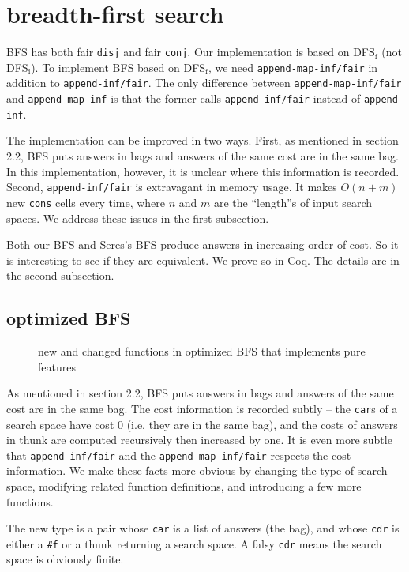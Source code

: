 \documentclass[format=acmlarge, review=true, authordraft=true]{acmart}
\newcommand{\conj}{\texttt{conj}}
\newcommand{\disj}{\texttt{disj}}
\newcommand{\DFSf }[0]{DFS$_\textrm{f}$}
\newcommand{\BFS  }[0]{BFS}
\begin{document}
\section{breadth-first search}

BFS has both fair \disj{} and fair \conj{}. Our implementation is based on 
DFS$_\textrm{f}$ (not DFS$_\textrm{i}$). To implement \BFS{} based on \DFSf{}, 
we need \texttt{append-map-inf/fair} in addition to \texttt{append-inf/fair}. 
The only difference between \texttt{append-map-inf/fair} and 
\texttt{append-map-inf} is that the former calls \texttt{append-inf/fair} 
instead of \texttt{append-inf}.

The implementation can be improved in two ways. First, as mentioned in 
section 2.2, BFS puts answers in bags and answers of the same cost are in the 
same bag. In this implementation, however, it is unclear where this information 
is recorded. Second, \texttt{append-inf/fair} is extravagant in memory usage. It 
makes $O(n+m)$ new \texttt{cons} cells every time, where $n$ and $m$ are the 
``length''s of input search spaces. We address these issues in the first 
subsection.

Both our BFS and Seres's BFS \citet{seres1999algebra} produce answers in 
increasing order of cost. So it is interesting to see if they are equivalent. 
We prove so in Coq. The details are in the second subsection.

\subsection{optimized BFS}

\begin{figure}
		
	\caption{new and changed functions in optimized BFS that implements pure 
	features}
	\label{BFS-opt}
\end{figure}

As mentioned in section 2.2, BFS puts answers in bags and answers of the 
same cost are in the same bag. The cost
information is recorded subtly -- the \texttt{car}s of a search space have cost 
0 (i.e. they are in the same bag), and the costs of answers in thunk are 
computed recursively then increased by one. It is even more subtle that
\texttt{append-inf/fair} and the \texttt{append-map-inf/fair} respects the cost 
information. We make these facts more obvious by changing the type of search 
space, modifying related function definitions, and introducing a few more 
functions.

The new type is a pair whose \texttt{car} is a list of answers (the bag), and 
whose \texttt{cdr} is either a \texttt{\#{}f} or a thunk returning a search 
space. A falsy \texttt{cdr} means the search space is obviously finite. 
\end{document}
